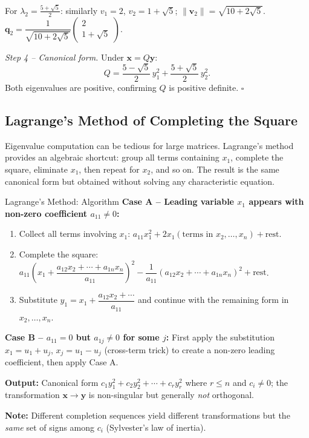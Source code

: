 \documentclass[12pt,a4paper]{article}
\begin{document}
For $\lambda_2 = \frac{5+\sqrt{5}}{2}$: similarly $v_1 = 2$, $v_2 = 1+\sqrt{5}$; $\|\mathbf{v}_2\|=\sqrt{10+2\sqrt{5}}$.
$\mathbf{q}_2 = \dfrac{1}{\sqrt{10+2\sqrt{5}}}\begin{pmatrix}2\\1+\sqrt{5}\end{pmatrix}$.

\textit{Step 4 -- Canonical form.}
Under $\mathbf{x} = Q\mathbf{y}$:
\[
\boxed{Q = \frac{5-\sqrt{5}}{2}\,y_1^{2} + \frac{5+\sqrt{5}}{2}\,y_2^{2}.}
\]
Both eigenvalues are positive, confirming $Q$ is positive definite. \hfill$\square$

\subsection{Lagrange's Method of Completing the Square}

Eigenvalue computation can be tedious for large matrices. Lagrange's method provides an algebraic shortcut: group all terms containing $x_1$, complete the square, eliminate $x_1$, then repeat for $x_2$, and so on. The result is the same canonical form but obtained without solving any characteristic equation.

\begin{infobox}{Lagrange's Method: Algorithm}
\textbf{Case A -- Leading variable $x_1$ appears with non-zero coefficient $a_{11} \neq 0$:}
\begin{enumerate}[leftmargin=1.5em]
  \item Collect all terms involving $x_1$: $a_{11}x_1^{2} + 2x_1(\text{terms in }x_2,\ldots,x_n) + \text{rest}$.
  \item Complete the square: $a_{11}\!\left(x_1 + \dfrac{a_{12}x_2+\cdots+a_{1n}x_n}{a_{11}}\right)^{\!2} - \dfrac{1}{a_{11}}(a_{12}x_2+\cdots+a_{1n}x_n)^{2} + \text{rest}$.
  \item Substitute $y_1 = x_1 + \dfrac{a_{12}x_2+\cdots}{a_{11}}$ and continue with the remaining form in $x_2,\ldots,x_n$.
\end{enumerate}

\textbf{Case B -- $a_{11}=0$ but $a_{1j}\neq 0$ for some $j$:}
First apply the substitution $x_1 = u_1 + u_j$, $x_j = u_1 - u_j$ (cross-term trick) to create a non-zero leading coefficient, then apply Case A.

\textbf{Output:} Canonical form $c_1 y_1^{2} + c_2 y_2^{2} + \cdots + c_r y_r^{2}$ where $r \leq n$ and $c_i \neq 0$; the transformation $\mathbf{x} \to \mathbf{y}$ is non-singular but generally \emph{not} orthogonal.

\textbf{Note:} Different completion sequences yield different transformations but the \emph{same} set of signs among $c_i$ (Sylvester's law of inertia).
\end{infobox}
\end{document}
